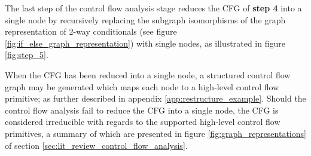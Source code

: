 The last step of the control flow analysis stage reduces the CFG of \textbf{step 4} into a single node by recursively replacing the subgraph isomorphisms of the graph representation of 2-way conditionals (see figure \ref{fig:if_else_graph_representation}) with single nodes, as illustrated in figure \ref{fig:step_5}.

When the CFG has been reduced into a single node, a structured control flow graph may be generated which maps each node to a high-level control flow primitive; as further described in appendix \ref{app:restructure_example}. Should the control flow analysis fail to reduce the CFG into a single node, the CFG is considered irreducible with regards to the supported high-level control flow primitives, a summary of which are presented in figure \ref{fig:graph_representations} of section \ref{sec:lit_review_control_flow_analysis}.

